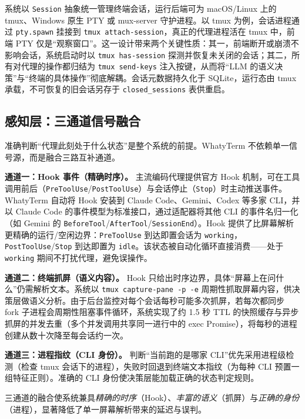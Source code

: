 系统以 \texttt{Session} 抽象统一管理终端会话，运行后端可为 macOS/Linux 上的 tmux、Windows 原生 PTY 或 mux-server 守护进程。以 tmux 为例，会话进程通过 \texttt{pty.spawn} 挂接到 \texttt{tmux attach-session}，真正的代理进程活在 tmux 中，前端 PTY 仅是“观察窗口”。这一设计带来两个关键性质：其一，前端断开或崩溃不影响会话，系统启动时以 \texttt{tmux has-session} 探测并恢复未关闭的会话；其二，所有对代理的操作都归结为 \texttt{tmux send-keys} 注入按键，从而将“LLM 的语义决策”与“终端的具体操作”彻底解耦。会话元数据持久化于 SQLite，运行态由 tmux 承载，不可恢复的旧会话另存于 \texttt{closed\_sessions} 表供重启。

\subsection{感知层：三通道信号融合}
\label{sec:arch-perception}

准确判断“代理此刻处于什么状态”是整个系统的前提。WhatyTerm 不依赖单一信号源，而是融合三路互补通道。

\textbf{通道一：Hook 事件（精确时序）。} 主流编码代理提供官方 Hook 机制，可在工具调用前后（\texttt{PreToolUse}/\texttt{PostToolUse}）与会话停止（\texttt{Stop}）时主动推送事件。WhatyTerm 自动将 Hook 安装到 Claude Code、Gemini、Codex 等多家 CLI，并以 Claude Code 的事件模型为标准接口，通过适配器将其他 CLI 的事件名归一化（如 Gemini 的 \texttt{BeforeTool}/\texttt{AfterTool}/\texttt{SessionEnd}）。Hook 提供了比屏幕解析更精确的运行/空闲边界：\texttt{PreToolUse} 到达即置会话为 \texttt{working}，\texttt{PostToolUse}/\texttt{Stop} 到达即置为 \texttt{idle}。该状态被自动化循环直接消费——处于 \texttt{working} 期间不打扰代理，避免误操作。

\textbf{通道二：终端抓屏（语义内容）。} Hook 只给出时序边界，具体“屏幕上在问什么”仍需解析文本。系统以 \texttt{tmux capture-pane -p -e} 周期性抓取屏幕内容，供决策层做语义分析。由于后台监控对每个会话每秒可能多次抓屏，若每次都同步 fork 子进程会周期性阻塞事件循环，系统实现了约 1.5 秒 TTL 的快照缓存与异步抓屏的并发去重（多个并发调用共享同一进行中的 exec Promise），将每秒的进程创建从数十次降至每会话约一次。

\textbf{通道三：进程指纹（CLI 身份）。} 判断“当前跑的是哪家 CLI”优先采用进程级检测（检查 tmux 会话下的进程），失败时回退到终端文本指纹（为每种 CLI 预置一组特征正则）。准确的 CLI 身份使决策层能加载正确的状态判定规则。

三通道的融合使系统兼具\emph{精确的时序}（Hook）、\emph{丰富的语义}（抓屏）与\emph{正确的身份}（进程），显著降低了单一屏幕解析带来的延迟与误判。

